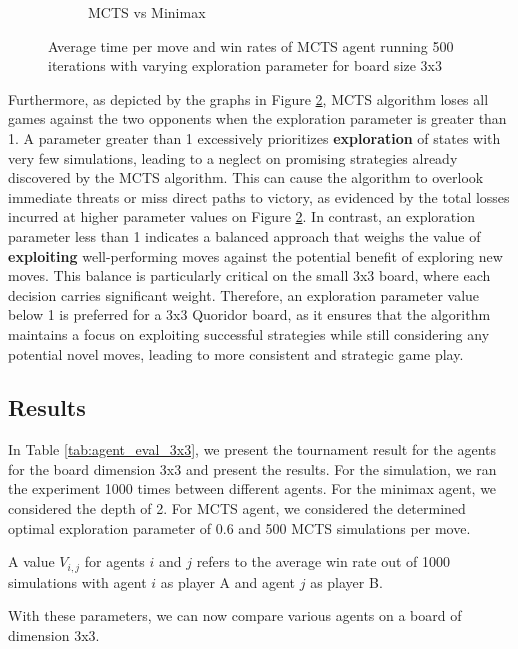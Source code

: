 \begin{figure}[!ht]
\begin{subfigure}{0.5\textwidth}
      \caption{MCTS vs Minimax}
        \label{fig:3x3MCTSTuningMinimax}
    \end{subfigure}
    \caption{Average time per move and win rates of MCTS agent running 500 iterations with varying exploration parameter for board size 3x3}
\label{fig:3x3MCTSTuning}
\end{figure}

Furthermore, as depicted by the graphs in Figure \ref{fig:3x3MCTSTuning}, MCTS algorithm loses all games against the two opponents when the exploration parameter is greater than 1. A parameter greater than 1 excessively prioritizes \textbf{exploration} of states with very few simulations, leading to a neglect on promising strategies already discovered by the MCTS algorithm. This can cause the algorithm to overlook immediate threats or miss direct paths to victory, as evidenced by the total losses incurred at higher parameter values on Figure \ref{fig:3x3MCTSTuning}. In contrast, an exploration parameter less than 1 indicates a balanced approach that weighs the value of \textbf{exploiting} well-performing moves against the potential benefit of exploring new moves. This balance is particularly critical on the small 3x3 board, where each decision carries significant weight. Therefore, an exploration parameter value below 1 is preferred for a 3x3 Quoridor board, as it ensures that the algorithm maintains a focus on exploiting successful strategies while still considering any potential novel moves, leading to more consistent and strategic game play.

\subsection{Results}
In Table \ref{tab:agent_eval_3x3}, we present the tournament result for the agents for the board dimension 3x3 and present the results. For the simulation, we ran the experiment 1000 times between different agents. For the minimax agent, we considered the depth of 2. For \gls{MCTS} agent, we considered the determined optimal exploration parameter of 0.6 and 500 \gls{MCTS} simulations per move.

A value $V_{i,j}$ for agents $i$ and $j$ refers to the average win rate out of 1000 simulations with agent $i$ as player A and agent $j$ as player B.

With these parameters, we can now compare various agents on a board of dimension 3x3.

